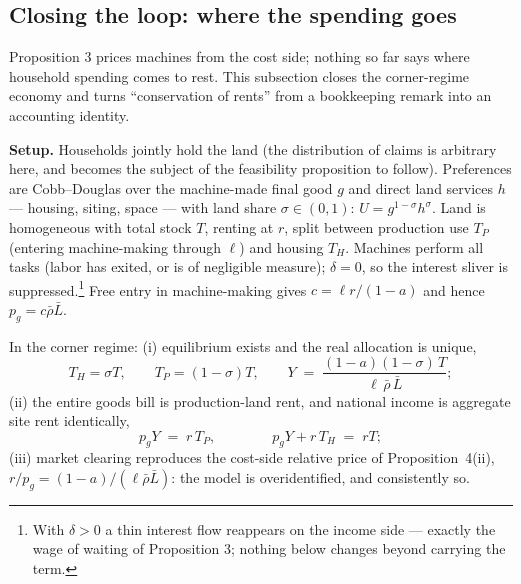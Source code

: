 %

\subsection*{Closing the loop: where the spending goes}

Proposition 3 prices machines from the cost side; nothing so far says where
household spending comes to rest. This subsection closes the corner-regime
economy and turns ``conservation of rents'' from a bookkeeping remark into an
accounting identity.

\textbf{Setup.} Households jointly hold the land (the distribution of claims
is arbitrary here, and becomes the subject of the feasibility proposition to
follow). Preferences are Cobb--Douglas over the machine-made final good $g$
and direct land services $h$ --- housing, siting, space --- with land share
$\sigma \in (0,1)$: $U = g^{1-\sigma}h^{\sigma}$. Land is homogeneous with
total stock $T$, renting at $r$, split between production use $T_P$ (entering
machine-making through $\ell$) and housing $T_H$. Machines perform all tasks
(labor has exited, or is of negligible measure); $\delta = 0$, so the interest
sliver is suppressed.\footnote{With $\delta > 0$ a thin interest flow
reappears on the income side --- exactly the wage of waiting of
Proposition 3; nothing below changes beyond carrying the term.} Free entry in
machine-making gives $c = \ell r/(1-a)$ and hence
$p_g = c\bar\rho\bar L$.

\begin{proposition}
In the corner regime: (i) equilibrium exists and the real allocation is
unique,
\[
T_H = \sigma T, \qquad T_P = (1-\sigma)T, \qquad
Y \;=\; \frac{(1-a)(1-\sigma)\,T}{\ell\,\bar\rho\,\bar L};
\]
(ii) the entire goods bill is production-land rent, and national income is
aggregate site rent identically,
\[
p_g Y \;=\; r\,T_P, \qquad\qquad p_g Y + r\,T_H \;=\; rT;
\]
(iii) market clearing reproduces the cost-side relative price of
Proposition~4(ii), $r/p_g = (1-a)/(\ell\bar\rho\bar L)$: the model is
overidentified, and consistently so.
\end{proposition}

